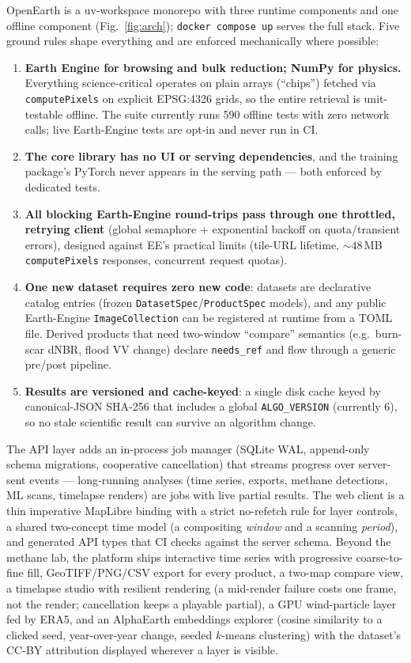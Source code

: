\documentclass[11pt]{article}
\newcommand{\code}[1]{\texttt{\small #1}}
\begin{document}
OpenEarth is a uv-workspace monorepo with three runtime components and one
offline component (Fig.~\ref{fig:arch}); \code{docker compose up} serves
the full stack. Five ground rules shape everything and are enforced
mechanically where possible:

\begin{enumerate}\itemsep2pt
\item \textbf{Earth Engine for browsing and bulk reduction; NumPy for
physics.} Everything science-critical operates on plain arrays
(``chips'') fetched via \code{computePixels} on explicit EPSG:4326 grids,
so the entire retrieval is unit-testable offline. The suite currently runs 590 offline tests with
zero network calls; live Earth-Engine tests are opt-in and never run in
CI.
\item \textbf{The core library has no UI or serving dependencies}, and the
training package's PyTorch never appears in the serving path --- both
enforced by dedicated tests.
\item \textbf{All blocking Earth-Engine round-trips pass through one
throttled, retrying client} (global semaphore + exponential backoff on
quota/transient errors), designed against EE's practical limits (tile-URL
lifetime, ${\sim}48\,$MB \code{computePixels} responses, concurrent
request quotas).
\item \textbf{One new dataset requires zero new code}: datasets are
declarative catalog entries (frozen \code{DatasetSpec}/\code{ProductSpec}
models), and any public Earth-Engine \code{ImageCollection} can be
registered at runtime from a TOML file. Derived products that need
two-window ``compare'' semantics (e.g.\ burn-scar dNBR, flood VV change)
declare \code{needs\_ref} and flow through a generic pre/post pipeline.
\item \textbf{Results are versioned and cache-keyed}: a single disk cache
keyed by canonical-JSON SHA-256 that includes a global
\code{ALGO\_VERSION} (currently 6), so no stale scientific result can
survive an algorithm change.
\end{enumerate}

The API layer adds an in-process job manager (SQLite WAL, append-only
schema migrations, cooperative cancellation) that streams progress over
server-sent events --- long-running analyses (time series, exports,
methane detections, ML scans, timelapse renders) are jobs with live
partial results. The web client is a thin imperative MapLibre binding with
a strict no-refetch rule for layer controls, a shared two-concept time
model (a compositing \emph{window} and a scanning \emph{period}), and
generated API types that CI checks against the server schema. Beyond the
methane lab, the platform ships interactive time series with progressive
coarse-to-fine fill, GeoTIFF/PNG/CSV export for every product, a
two-map compare view, a timelapse studio with resilient rendering
(a mid-render failure costs one frame, not the render; cancellation keeps
a playable partial), a GPU wind-particle layer fed by ERA5, and an
AlphaEarth embeddings explorer (cosine similarity to a clicked seed,
year-over-year change, seeded $k$-means clustering) with the dataset's
CC-BY attribution displayed wherever a layer is visible.
\end{document}
